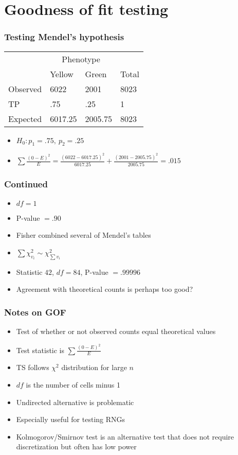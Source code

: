 \documentclass[aspectratio=169]{beamer}
\begin{document}
\section{Goodness of fit testing}
\begin{frame}\frametitle{Testing Mendel's hypothesis}
\begin{center}  
\ttfamily
\begin{tabular}{llll}
                 & \multicolumn{2}{c}{Phenotype} \\
                 & Yellow  & Green   & Total \\ \hline
Observed         & 6022    & 2001    & 8023\\
TP               & .75     & .25     & 1   \\ 
Expected         & 6017.25 & 2005.75 & 8023\\ \hline 
\end{tabular}
\normalfont
\end{center}
\begin{itemize}
\item $H_0:p_1 = .75, ~ p_2 = .25$ 
\item $\sum \frac{(0-E)^2}{E} = \frac{(6022 - 6017.25)^2}{6017.25} +
  \frac{(2001 - 2005.75)^2}{2005.75} = .015$
\end{itemize}
\end{frame}

\begin{frame}\frametitle{Continued}
\begin{itemize}
\item $df = 1$
\item P-value $= .90$
\item Fisher combined several of Mendel's tables
\item $\sum \chi^2_{v_i} \sim \chi^2_{\sum v_i}$
\item Statistic $42$, $df = 84$, P-value $= .99996$
\item Agreement with theoretical counts is perhaps too good?
\end{itemize}
\end{frame}

\begin{frame}\frametitle{Notes on GOF}
\begin{itemize}
\item Test of whether or not observed 
  counts equal theoretical values
\item Test statistic is $\sum \frac{(0-E)^2}{E}$
\item TS follows $\chi^2$ distribution for large $n$
\item $df$ is the number of cells minus 1
\item Undirected alternative is problematic
\item Especially useful for testing RNGs
\item Kolmogorov/Smirnov test is an  alternative 
  test that does not require  discretization but often
  has low power
\end{itemize}
\end{frame}
\end{document}

